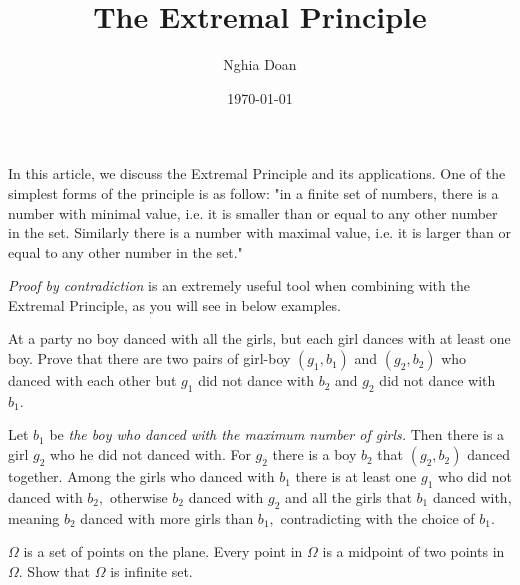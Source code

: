 \documentclass{article}
\title{The Extremal Principle}
\author{Nghia Doan}
\date{\today}
\begin{document}
\maketitle

In this article, we discuss the Extremal Principle and its applications.
One of the simplest forms of the principle is as follow:
"in a finite set of numbers, there is a number with minimal value,
i.e. it is smaller than or equal to any other number in the set.
Similarly there is a number with maximal value,
i.e. it is larger than or equal to any other number in the set."

\textit{Proof by contradiction} is an extremely useful tool when combining with the Extremal Principle,
as you will see in below examples.

\begin{example*}

    At a party no boy danced with all the girls,
    but each girl dances with at least one boy.
    Prove that there are two pairs of girl-boy $(g_1, b_1)$ and $(g_2, b_2)$
    who danced with each other but $g_1$ did not dance with $b_2$
    and $g_2$ did not dance with $b_1.$
\end{example*}

\begin{soln}
    Let $b_1$ be \textit{the boy who danced with the maximum number of girls.}
    Then there is a girl $g_2$ who he did not danced with.
    For $g_2$ there is a boy $b_2$ that $(g_2,b_2)$ danced together.
    Among the girls who danced with $b_1$ there is at least one $g_1$ who did not danced with $b_2,$
    otherwise $b_2$ danced with $g_2$ and all the girls that $b_1$ danced with,
    meaning $b_2$ danced with more girls than $b_1,$ contradicting with the choice of $b_1.$
\end{soln}

\begin{example*}

    $\Omega$ is a set of points on the plane.
    Every point in $\Omega$ is a midpoint of two points in $\Omega$.
    Show that $\Omega$ is infinite set.
\end{example*}
\end{document}
